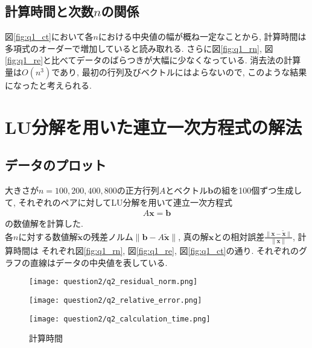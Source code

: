 \documentclass[uplatex,a4j]{jsarticle}
\begin{document}
\subsection{計算時間と次数$n$の関係}
\label{sec:q1_3}
図\ref{fig:q1_ct}において各$n$における中央値の幅が概ね一定なことから, 
計算時間は多項式のオーダーで増加していると読み取れる. 
さらに図\ref{fig:q1_rn}, 図\ref{fig:q1_re}と比べてデータのばらつきが大幅に少なくなっている.
消去法の計算量は$O(n^3)$であり, 最初の行列及びベクトルにはよらないので, このような結果になったと考えられる.


\section{LU分解を用いた連立一次方程式の解法}
\label{sec:q2}

\subsection{データのプロット}
\label{sec:q2_1}

大きさが$n = 100,200,400,800$の正方行列$A$とベクトル$\bm{b}$の組を100個ずつ生成して, 
それぞれのペアに対してLU分解を用いて連立一次方程式
\begin{align}
  A \bm{x} = \bm{b}
\end{align}
の数値解を計算した. \\
各$n$に対する数値解$\bm{\tilde{x}}$の残差ノルム$\| \bm{b} - A \bm{\tilde{x}} \|$, 
真の解$\bm{x}$との相対誤差$\frac{\| \bm{x} - \bm{\tilde{x}} \|}{\| \bm{x} \|}$, 計算時間は
それぞれ図\ref{fig:q1_rn}, 図\ref{fig:q1_re}, 図\ref{fig:q1_ct}の通り. 
それぞれのグラフの直線はデータの中央値を表している.

\begin{figure}[htbp]
  \centering

  \begin{minipage}[t]{0.48\textwidth}
    \centering
    \texttt{[image: question2/q2\_residual\_norm.png]}
    \label{fig:q2_rn}
  \end{minipage}
  \hfill
  \begin{minipage}[t]{0.48\textwidth}
    \centering
    \texttt{[image: question2/q2\_relative\_error.png]}
    \label{fig:q2_re}
  \end{minipage}
  
\end{figure}

\begin{figure}[ht]
  \centering
  \texttt{[image: question2/q2\_calculation\_time.png]}
  \caption{計算時間}
  \label{fig:q2_ct}
\end{figure}
\end{document}
